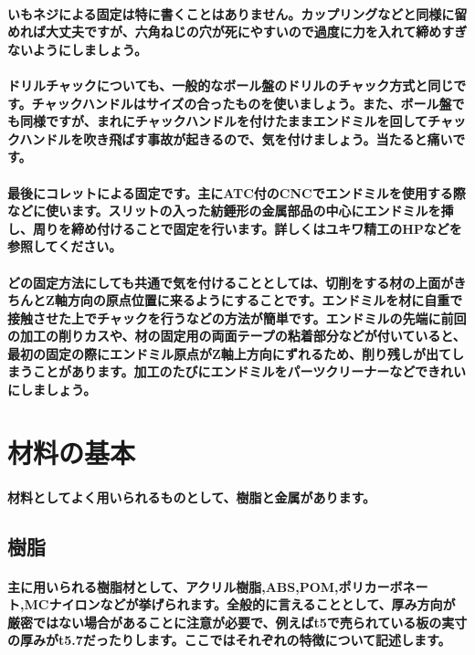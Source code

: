 \documentclass[b5paper, 9pt, twocolumn, titlepage,openany]{jsbook}%
\begin{document}
\paragraph{いもネジによる固定は特に書くことはありません。カップリングなどと同様に留めれば大丈夫ですが、六角ねじの穴が死にやすいので過度に力を入れて締めすぎないようにしましょう。}
\paragraph{ドリルチャックについても、一般的なボール盤のドリルのチャック方式と同じです。チャックハンドルはサイズの合ったものを使いましょう。また、ボール盤でも同様ですが、まれにチャックハンドルを付けたままエンドミルを回してチャックハンドルを吹き飛ばす事故が起きるので、気を付けましょう。当たると痛いです。}
\paragraph{最後にコレットによる固定です。主にATC付のCNCでエンドミルを使用する際などに使います。スリットの入った紡錘形の金属部品の中心にエンドミルを挿し、周りを締め付けることで固定を行います。詳しくはユキワ精工のHPなどを参照してください。}
\paragraph{どの固定方法にしても共通で気を付けることとしては、切削をする材の上面がきちんとZ軸方向の原点位置に来るようにすることです。エンドミルを材に自重で接触させた上でチャックを行うなどの方法が簡単です。エンドミルの先端に前回の加工の削りカスや、材の固定用の両面テープの粘着部分などが付いていると、最初の固定の際にエンドミル原点がZ軸上方向にずれるため、削り残しが出てしまうことがあります。加工のたびにエンドミルをパーツクリーナーなどできれいにしましょう。}

\section{材料の基本}

\paragraph{材料としてよく用いられるものとして、樹脂と金属があります。}

\subsection{樹脂}

\paragraph{主に用いられる樹脂材として、アクリル樹脂,ABS,POM,ポリカーボネート,MCナイロンなどが挙げられます。全般的に言えることとして、厚み方向が厳密ではない場合があることに注意が必要で、例えばt5で売られている板の実寸の厚みがt5.7だったりします。ここではそれぞれの特徴について記述します。}
\end{document}
